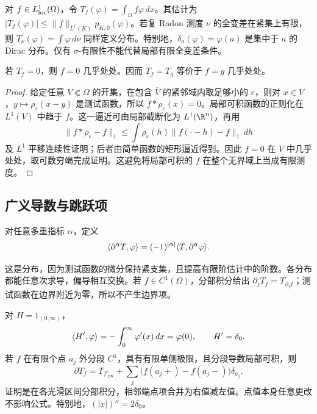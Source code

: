 \begin{example}
对 $f\in L^1_{\mathrm{loc}}(\Omega)$，令 $T_f(\varphi)=\int_\Omega f\varphi\,dx$。其估计为 $|T_f(\varphi)|\le\|f\|_{L^1(K)}p_{K,0}(\varphi)$。若复 Radon 测度 $\nu$ 的全变差在紧集上有限，则 $T_\nu(\varphi)=\int\varphi\,d\nu$ 同样定义分布。特别地，$\delta_a(\varphi)=\varphi(a)$ 是集中于 $a$ 的 Dirac 分布。仅有 $\sigma$-有限性不能代替局部有限全变差条件。
\end{example}

\begin{proposition}[局部可积函数到分布的嵌入是单射]\label{prop:y1-regular-injective}
若 $T_f=0$，则 $f=0$ 几乎处处。因而 $T_f=T_g$ 等价于 $f=g$ 几乎处处。
\end{proposition}
\begin{proof}
给定任意 $V\Subset\Omega$ 的开集，在包含 $\overline V$ 的紧邻域内取足够小的 $\varepsilon$，则对 $x\in V$，$y\mapsto\rho_\varepsilon(x-y)$ 是测试函数，所以 $f*\rho_\varepsilon(x)=0$。局部可积函数的正则化在 $L^1(V)$ 中趋于 $f$。这一逼近可由局部截断化为 $L^1(\R^n)$，再用
\[
 \|f*\rho_\varepsilon-f\|_1
 \le\int\rho_\varepsilon(h)\|f(\cdot-h)-f\|_1\,dh
\]
及 $L^1$ 平移连续性证明；后者由简单函数的矩形逼近得到。因此 $f=0$ 在 $V$ 中几乎处处，取可数穷竭完成证明。这避免将局部可积的 $f$ 在整个无界域上当成有限测度。
\end{proof}

\subsection{广义导数与跳跃项}
\begin{definition}[分布导数]
对任意多重指标 $\alpha$，定义
\[
 \langle \partial^\alpha T,\varphi\rangle
 =(-1)^{|\alpha|}\langle T,\partial^\alpha\varphi\rangle.
\]
\end{definition}
这是分布，因为测试函数的微分保持紧支集，且提高有限阶估计中的阶数。各分布都能任意次求导，偏导相互交换。若 $f\in C^1(\Omega)$，分部积分给出 $\partial_jT_f=T_{\partial_jf}$；测试函数在边界附近为零，所以不产生边界项。

\begin{example}
对 $H=1_{(0,\infty)}$，
\[
 \langle H',\varphi\rangle=-\int_0^\infty\varphi'(x)\,dx=\varphi(0),\qquad H'=\delta_0.
\]
若 $f$ 在有限个点 $a_j$ 外分段 $C^1$，具有有限单侧极限，且分段导数局部可积，则
\[
 \partial T_f=T_{f'_{\mathrm{pw}}}
 +\sum_j\bigl(f(a_j+)-f(a_j-)\bigr)\delta_{a_j}.
\]
证明是在各光滑区间分部积分，相邻端点项合并为右值减左值。点值本身任意更改不影响公式。特别地，$(|x|)''=2\delta_0$。
\end{example}


